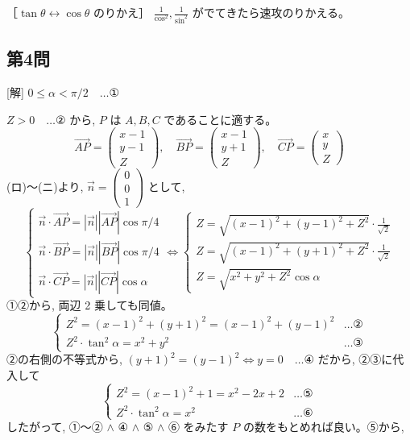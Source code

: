 \documentclass[../main.tex]{subfiles}
\begin{document}
［$\tan\theta \leftrightarrow \cos\theta$ のりかえ］
$\frac{1}{\cos^2}, \frac{1}{\sin^2}$ がでてきたら速攻のりかえる。

\subsection*{第4問}

[解] $0 \le \alpha < \pi/2 \quad \dots \text{①}$

$Z > 0 \quad \dots \text{②}$ から, $P$ は $A, B, C$ であることに適する。
\[
  \vec{AP} =
  \begin{pmatrix} x-1 \\ y-1 \\ Z
  \end{pmatrix}, \quad
  \vec{BP} =
  \begin{pmatrix} x-1 \\ y+1 \\ Z
  \end{pmatrix}, \quad
  \vec{CP} =
  \begin{pmatrix} x \\ y \\ Z
  \end{pmatrix}
\]
(ロ)～(ニ)より, $\vec{n} =
\begin{pmatrix} 0 \\ 0 \\ 1
\end{pmatrix}$ として,
\[
  \begin{cases}
    \vec{n} \cdot \vec{AP} = |\vec{n}| |\vec{AP}| \cos\pi/4 \\
    \vec{n} \cdot \vec{BP} = |\vec{n}| |\vec{BP}| \cos\pi/4 \\
    \vec{n} \cdot \vec{CP} = |\vec{n}| |\vec{CP}| \cos\alpha
  \end{cases}
  \iff
  \begin{cases}
    Z = \sqrt{(x-1)^2 + (y-1)^2 + Z^2} \cdot \frac{1}{\sqrt{2}} \\
    Z = \sqrt{(x-1)^2 + (y+1)^2 + Z^2} \cdot \frac{1}{\sqrt{2}} \\
    Z = \sqrt{x^2 + y^2 + Z^2} \cos\alpha
  \end{cases}
\]
①②から, 両辺 2 乗しても同値。
\[
  \begin{cases}
    Z^2 = (x-1)^2 + (y+1)^2 = (x-1)^2 + (y-1)^2 & \dots \text{②} \\
    Z^2 \cdot \tan^2\alpha = x^2 + y^2 & \dots \text{③}
  \end{cases}
\]
②の右側の不等式から, $(y+1)^2 = (y-1)^2 \iff y=0 \quad \dots \text{④}$ だから, ②③に代入して
\[
  \begin{cases}
    Z^2 = (x-1)^2 + 1 = x^2 - 2x + 2 & \dots \text{⑤} \\
    Z^2 \cdot \tan^2\alpha = x^2 & \dots \text{⑥}
  \end{cases}
\]
したがって, ①～② $\land$ ④ $\land$ ⑤ $\land$ ⑥ をみたす $P$ の数をもとめれば良い。⑤から,
\end{document}
